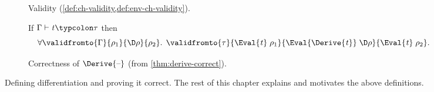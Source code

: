 \begin{figure}
\begin{subfigure}[c]{1.0\textwidth}
\begin{typing}
  \Axiom
  {\validfromto{\EmptyContext}{\EmptyEnv}{\EmptyEnv}{\EmptyEnv}}

\end{typing}

\caption{Validity (\cref{def:ch-validity,def:env-ch-validity}).}
\label{fig:validity}
\label{fig:correctness:change-environments}
\end{subfigure}

\baselineskip
\begin{subfigure}[c]{1.0\textwidth}
  \centering
If \ensuremath{\Gamma\vdash\Varid{t}\typcolon\tau} then
\[\ensuremath{\forall \validfromto{\Gamma}{\rho_{1}}{\D\rho}{\rho_{2}}\hsforall \hsdot{\circ }{\mathpunct{.}}\;\validfromto{\tau}{\Eval{\Varid{t}}\;\rho_{1}}{\Eval{\Derive{\Varid{t}}}\;\D\rho}{\Eval{\Varid{t}}\;\rho_{2}}}.\]
\caption{Correctness of \ensuremath{\Derive{\text{\textendash}}} (from \cref{thm:derive-correct}).}
\label{fig:correctness:derive-correct}
\end{subfigure}
\caption{Defining differentiation and proving it correct. The rest of this chapter explains and motivates the above definitions.}
  \label{fig:differentiation}
\end{figure}
